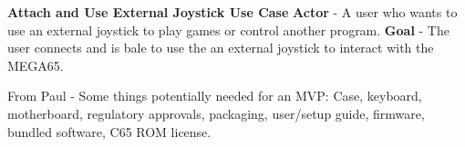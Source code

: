 \textbf{Attach and Use External Joystick Use Case}
\textbf{Actor} - A user who wants to use an external joystick to play games or control another program.
\textbf{Goal} - The user connects and is bale to use the an external joystick to interact with the MEGA65.


From Paul - 
Some things potentially needed for an MVP: Case, keyboard, motherboard, regulatory approvals, packaging, user/setup guide, firmware, bundled software, C65 ROM license.

